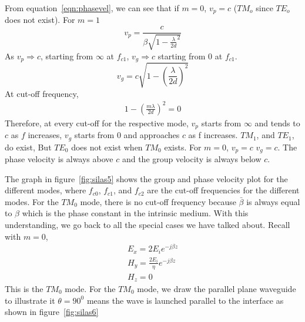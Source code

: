 From equation~\ref{eqn:phasevel}, we can see that if $m=0$, $v_{p} =c$ ($TM_o$ since $TE_o$ does not exist). For $m=1$
\begin{equation*}
v_{p}= \frac{c}{\beta \sqrt{1- \frac{\lambda}{2d}^{2}}}
\end{equation*}
As $v_{p} \Rightarrow c$, starting from $\infty$ at $f_{c1}$, $v_{g} \Rightarrow c$ starting from 0 at $f_{c1}$.
\begin{equation*}
v_{g}= c\sqrt{1-\left(\frac{\lambda}{2d}\right)^{2}}
\end{equation*}
At cut-off frequency, 
\begin{align*}
1-\left(\frac{m\lambda}{2d}\right)^{2} = 0
\end{align*}
Therefore, at every cut-off for the respective mode, $v_{p}$ starts from $\infty$ and tends to $c$ as $f$ increases, $v_{g}$ starts from 0 and approaches $c$ as f increases. $TM_{1}$, and $TE_{1}$, do exist, But $TE_0$ does not exist when $TM_0$ exists. For $m = 0$, $v_{p}=c$ $v_{g}=c$. The phase velocity is always above $c$ and the group velocity is always below $c$.

The graph in figure~\ref{fig:silas5} shows the group and phase velocity plot for the different modes, where $f_{c0}$, $f_{c1}$, and $f_{c2}$ are the cut-off frequencies for the different modes. For the $TM_0$ mode, there is no cut-off frequency because $\bar{\beta}$ is always equal to $\beta$ which is the phase constant in the intrinsic medium. With this understanding, we go back to all the special cases we have talked about. Recall with $m = 0$, 
\begin{align*}
E_{x} =2E_{i} e^{-j\beta z}\\
H_{y} = \frac{2E_{i}}{\eta} e^{-j\beta z}\\
H_{z} =0
\end{align*}
This is the $TM_0$ mode. For the $TM_0$ mode, we draw the parallel plane waveguide to illustrate it $\theta =90^{0}$ means the wave is launched parallel to the interface as shown in figure~\ref{fig:silas6}

